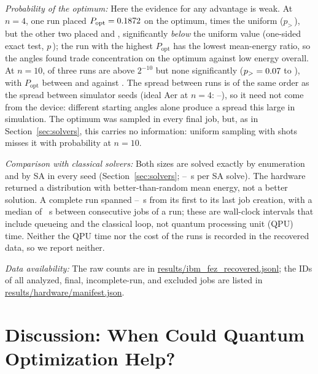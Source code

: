 \documentclass[journal]{IEEEtran}
\newcommand{\Popt}{P_{\mathrm{opt}}}
\begin{document}
\emph{Probability of the optimum:} Here the evidence for any advantage is weak. At $n=4$,
one run placed $\Popt=\HwNFourPoptMax$ on the optimum, \HwNFourPoptMaxRatio{} times the
uniform \HwNFourUniform{} ($p_>$\,\HwNFourPMin), but the other two placed \HwNFourPoptMid{} and
\HwNFourPoptMin, significantly \emph{below} the uniform value (one-sided exact test,
$p$\,\HwNFourPLessMax); the run with the highest
$\Popt$ has the lowest mean-energy ratio, so the angles found trade concentration on the
optimum against low energy overall. At $n=10$, \HwNOneZeroRunsAbove{} of three runs are
above $2^{-10}$ but none significantly ($p_>=0.07$ to \HwNOneZeroPMax), with
$\Popt$ between \HwNOneZeroPoptMin{} and \HwNOneZeroPoptMax{} against \HwNOneZeroUniform. The
spread between runs is of the same order as the spread between simulator seeds (ideal Aer
at $n=4$: \HwNFourIdealPoptMin--\HwNFourIdealPoptMax), so it need not come from the
device: different starting angles alone produce a spread this large in simulation. The optimum was sampled in every final job, but,
as in Section~\ref{sec:solvers}, this carries no information: uniform sampling with
\HwFinalShots{} shots misses it with probability \HwNOneZeroUniformMiss{} at $n=10$.

\emph{Comparison with classical solvers:} Both sizes are solved exactly by enumeration and
by SA in every seed (Section~\ref{sec:solvers}; \SaTimeMin--\SaTimeMax~s per SA solve). The
hardware returned a distribution with better-than-random mean energy, not a better solution.
A complete run spanned \HwRunSpanMin--\HwRunSpanMax~s from its first to its last job
creation, with a median of \HwJobIntervalMedian~s between consecutive jobs of a run; these
are wall-clock intervals that include queueing and the classical loop, not quantum processing unit (QPU) time. Neither the QPU time nor the cost of the runs is recorded in the recovered data, so we report
neither.

\emph{Data availability:} The raw counts are in \url{results/ibm_fez_recovered.jsonl}; the IDs of all
analyzed, final, incomplete-run, and excluded jobs are listed in
\url{results/hardware/manifest.json}.

\section{Discussion: When Could Quantum Optimization Help?}
\label{sec:discussion}
\end{document}
